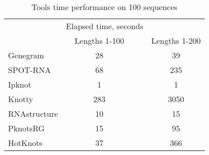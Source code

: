 \begin{table}
\centering
\caption{Tools time performance on 100 sequences}
\begin{tabular}{@{}lccc@{}}\toprule
& \multicolumn{2}{c}{\phantom{abc}  \phantom{abc}  \phantom{abc} Elapsed time, seconds}  \\
& Lengths 1-100 && Lengths 1-200  \\ \cmidrule{2-2} \cmidrule{4-4} 
Genegram & 28 && 39 \\
SPOT-RNA & 68 && 235 \\
Ipknot & 1 && 1 \\
Knotty & 283 && 3050 \\
RNAstructure & 10 && 15 \\
PknotsRG & 15 && 95 \\
HotKnots & 37 && 366 \\
\bottomrule
\end{tabular}
\label{table_time}
\end{table}